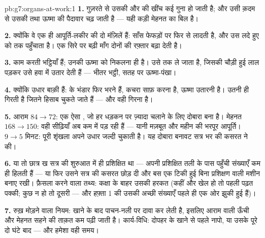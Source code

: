 \begin{solution}{pb:g7:organs-at-work:1}
\textbf{1.} गुज़रते  से उसकी  और  की खींच कई गुना हो
जाती है; और उसी क़दम से उसकी  तथा ऊष्मा की पैदावार
चढ़ जाती है --- यही कड़ी मेहनत का बिल है।

\textbf{2.} क्योंकि वे एक ही आपूर्ति-लकीर की दो मंज़िलें हैं: साँस
फेफड़ों पर  फिर से लादती है, और  उस लदे हुए  को  तक
पहुँचाता है। एक सिरे पर बढ़ी माँग दोनों की रफ़्तार बढ़ा देती है।

\textbf{3.} काम करती  भट्ठियाँ हैं; उनकी ऊष्मा को निकलना ही है।
 उसे  तक ले जाता है, जिसकी चौड़ी हुई  लाल पड़कर उसे
हवा में उतार देती हैं --- भीतर भट्ठी, सतह पर ऊष्मा-पंखा।

\textbf{4.} क्योंकि उधार बाक़ी हैं:  के भंडार फिर भरने हैं, कचरा
साफ़ करना है, ऊष्मा उतारनी है।  उतनी ही गिरती है जितने हिसाब चुकते
जाते हैं --- और वही गिरना  है।

\textbf{5.} आराम $84 \to 72$: एक ऐसा , जो हर धड़कन पर ज़्यादा चलाने
के लिए दोबारा बना है। मेहनत $168 \to 150$: वही सीढ़ियाँ अब कम में पड़
रही हैं --- यानी मज़बूत  और महीन  की भरपूर आपूर्ति। 
$9 \to 5$ मिनट: पूरी शृंखला अपने उधार जल्दी चुकाती है। यह दोबारा बनावट
सत्र भर की कसरत ने की।

\textbf{6.} या तो छात्र ख सत्र की शुरुआत में ही प्रशिक्षित था --- अपनी
प्रशिक्षित तली के पास पहुँची संख्याएँ कम ही हिलती हैं --- या फिर उसने
सत्र की कसरत छोड़ दी और बस एक टिकी हुई बिना प्रशिक्षण वाली मशीन बनाए
रखी। फ़ैसला करने वाला तथ्य: कक्षा के बाहर उसकी हरकत (कहीं और खेल हो तो
पहली पढ़त पक्की; कुछ न हो तो दूसरी --- और हफ़्ता 1 की उसकी अच्छी
संख्याएँ पहले ही एक ओर झुकी हुई हैं)।

\textbf{7.} रुख़ मोड़ने वाला नियम: खाने के बाद पाचन-नली  पर दावा
कर लेती है, इसलिए आराम वाली  ऊँची और मेहनत सहने की ताक़त कम पढ़ी
जाती है। कार्य-विधि: दोपहर के खाने से पहले नापो, या उसके पूरे दो घंटे
बाद --- और हमेशा वही समय।


\end{solution}
